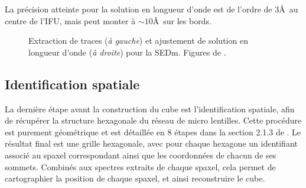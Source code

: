 \documentclass[../main/main.tex]{subfiles}
\begin{document}
La précision atteinte pour la solution en longueur d'onde est de l'ordre
de $3$\AA\ au centre de l'IFU, mais peut monter à $\sim10$\AA\ sur les bords.

\begin{figure}[ht]
\centering
{}\hfill
{}
\caption[Extraction de traces et solution en longueur
d'onde pour la
SEDm]{Extraction de traces (\textit{à gauche}) et ajustement de solution en longueur
  d'onde (\textit{à droite}) pour la SEDm. Figures de \citet{pysedm}.}
\label{fig:calibsedm}
\end{figure}

\subsection{Identification spatiale}\label{ssec:spaceid}
La dernière étape avant la construction du cube est l'identification
spatiale, afin de récupérer la structure hexagonale du réseau de micro
lentilles.
Cette procédure est purement géométrique et est détaillée en 8 étapes
dans la section 2.1.3 de \citet{pysedm}. Le résultat final est une
grille hexagonale, avec pour chaque hexagone un identifiant associé au
spaxel correspondant ainsi que les coordonnées de chacun de ses sommets.
Combinés aux spectres extraits de chaque spaxel, cela permet de
cartographier la position de chaque spaxel, et ainsi reconstruire le
cube.
\end{document}
